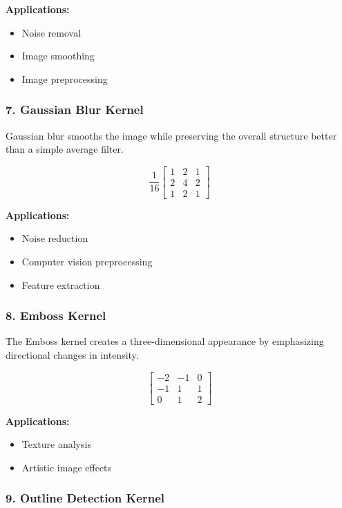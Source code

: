 \documentclass[11pt]{article}
\begin{document}
\textbf{Applications:}
\begin{itemize}
\item Noise removal
\item Image smoothing
\item Image preprocessing
\end{itemize}

\subsubsection*{7. Gaussian Blur Kernel}

Gaussian blur smooths the image while preserving the overall structure better than a simple average filter.

\[
\frac{1}{16}
\begin{bmatrix}
1 & 2 & 1\\
2 & 4 & 2\\
1 & 2 & 1
\end{bmatrix}
\]

\textbf{Applications:}
\begin{itemize}
\item Noise reduction
\item Computer vision preprocessing
\item Feature extraction
\end{itemize}

\subsubsection*{8. Emboss Kernel}

The Emboss kernel creates a three-dimensional appearance by emphasizing directional changes in intensity.

\[
\begin{bmatrix}
-2 & -1 & 0\\
-1 & 1 & 1\\
0 & 1 & 2
\end{bmatrix}
\]

\textbf{Applications:}
\begin{itemize}
\item Texture analysis
\item Artistic image effects
\end{itemize}

\subsubsection*{9. Outline Detection Kernel}
\end{document}
